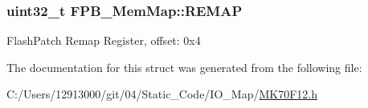 \subsubsection[{R\+E\+M\+A\+P}]{\setlength{\rightskip}{0pt plus 5cm}uint32\+\_\+t F\+P\+B\+\_\+\+Mem\+Map\+::\+R\+E\+M\+A\+P}\label{struct_f_p_b___mem_map_acdaa312f2de037db4f203b9cfd303772}
Flash\+Patch Remap Register, offset\+: 0x4 

The documentation for this struct was generated from the following file\+:\begin{DoxyCompactItemize}
\item 
C\+:/\+Users/12913000/git/04/\+Static\+\_\+\+Code/\+I\+O\+\_\+\+Map/\hyperlink{_m_k70_f12_8h}{M\+K70\+F12.\+h}\end{DoxyCompactItemize}
